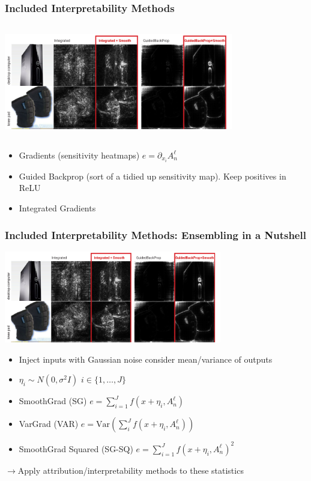 \documentclass{beamer}
\theoremstyle{mystyle}
\begin{document}
\begin{frame}
	\frametitle{Included Interpretability Methods}
	\includegraphics[width=10cm, height=5cm]{compareSGBP.png}

	\begin{itemize}
	
	\item Gradients (sensitivity heatmaps) $e = \partial_{x_i} A_n^{\ell} $ \pause

	\item Guided Backprop (sort of a tidied up sensitivity map). Keep positives in ReLU \pause
	\item Integrated Gradients
	
	\end{itemize}
\end{frame}
\begin{frame}
	\frametitle{Included Interpretability Methods: Ensembling in a Nutshell}
	\includegraphics[width=9.5cm, height=4cm]{compareSGBP.png}
\begin{itemize}
\item Inject inputs with Gaussian noise consider mean/variance of outputs \pause
\item $\eta_i \sim N(0, \sigma ^2 I)$ $i\in \{1,\ldots, J\} $ \pause
\item SmoothGrad (SG) $e = \sum_{i=1}^{J} {f( x + \eta_i, A_n^{\ell}) }$ \pause
\item VarGrad (VAR) $e = \text{Var}\left(  \sum_{i}^{J} {f(x + \eta_i, A_n^{\ell})}\right) $ \pause
\item SmoothGrad Squared (SG-SQ) $e = \sum_{i=1}^{J} {f( x + \eta_i, A_n^{\ell})^{2} }$\pause
\end{itemize}
$\to$Apply attribution/interpretability methods to these statistics
\end{frame}
\end{document}
